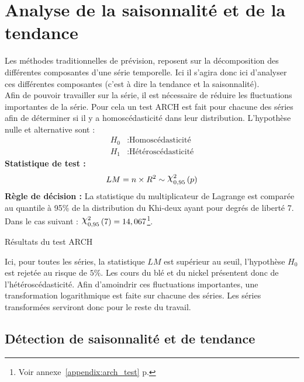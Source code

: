 \section{Analyse de la saisonnalité et de la tendance}
Les méthodes traditionnelles de prévision, reposent sur la décomposition des différentes composantes d'une série temporelle. Ici il s'agira donc
ici d'analyser ces différentes composantes (c'est à dire la tendance et la saisonnalité).\\[11pt]
Afin de pouvoir travailler sur la série, il est nécessaire de réduire les fluctuations importantes de la série. Pour cela un test ARCH est fait pour chacune des 
séries afin de déterminer si il y a homoscédasticité dans leur distribution. L'hypothèse nulle et alternative sont :
\begin{equation*}
    \begin{split}
        H_{0} &: \text{Homoscédasticité} \\
        H_{1} &: \text{Hétéroscédasticité}
    \end{split}
\end{equation*}
\textbf{Statistique de test :} 
    \begin{equation*}
        LM = n \times R^{2} \sim \rchi^{2}_{0,95} \, (p)
    \end{equation*}
\textbf{Règle de décision :} La statistique du multiplicateur de Lagrange est comparée au quantile à 95\% de la distribution du Khi-deux ayant pour degrés de liberté 7. 
Dans le cas suivant : $\rchi^{2}_{0,95}\,(7) = 14,067$\footnote{Voir annexe~\ref{appendix:arch_test} p.\pageref{appendix:arch_test}}.
\begin{table}[H]
    \centering
    \caption{Résultats du test ARCH}
    \sffamily
    
\end{table}
Ici, pour toutes les séries, la statistique $LM$ est supérieur au seuil, l'hypothèse $H_{0}$ est  rejetée au risque de $5\%$. Les cours du blé et du nickel
présentent donc de l'hétéroscédasticité. Afin d'amoindrir ces fluctuations importantes, une transformation logarithmique est faite sur chacune des séries. Les séries 
transformées serviront donc pour le reste du travail.
\subsection{Détection de saisonnalité et de tendance}
